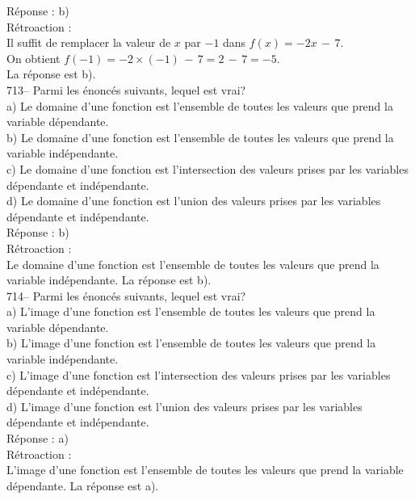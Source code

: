 ﻿\documentclass[letterpaper, 12pt]{article}
\begin{document}
R\'eponse : b)\\

R\'etroaction : \\
Il suffit de remplacer la valeur de $x$ par $-1$ dans $f(x)=-2x\,-\,7$.\\
On obtient $f(-1)=-2\times(-1)\,-\,7=2\,-\,7=-5$.\\
La r\'eponse est b).\\

713--  Parmi les \'enonc\'es suivants, lequel est vrai?\\
a) Le domaine d'une fonction est l'ensemble de toutes les valeurs que prend
la variable d\'ependante.\\
b) Le domaine d'une fonction est l'ensemble de toutes les valeurs que prend
la variable ind\'ependante.\\
c) Le domaine d'une fonction est l'intersection des valeurs prises par les
variables d\'ependante et ind\'ependante.\\
d) Le domaine d'une fonction est l'union des valeurs prises par les
variables d\'ependante et ind\'ependante.\\

R\'eponse : b)\\

R\'etroaction : \\
Le domaine d'une fonction est l'ensemble de toutes les valeurs que prend la
variable ind\'ependante.  La r\'eponse est b).\\

714--  Parmi les \'enonc\'es suivants, lequel est vrai?\\
a) L'image d'une fonction est l'ensemble de toutes les valeurs que prend la
variable d\'ependante.\\
b) L'image d'une fonction est l'ensemble de toutes les valeurs que prend la
variable ind\'ependante.\\
c) L'image d'une fonction est l'intersection des valeurs prises par les
variables d\'ependante et ind\'ependante.\\
d) L'image d'une fonction est l'union des valeurs prises par les variables
d\'ependante et ind\'ependante.\\

R\'eponse : a)\\

R\'etroaction : \\
L'image d'une fonction est l'ensemble de toutes les valeurs que prend la
variable d\'ependante.  La r\'eponse est a).\\
\end{document}
